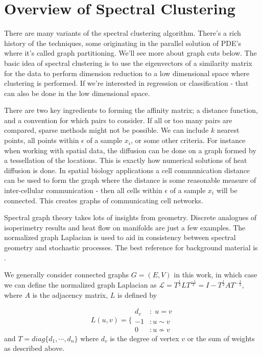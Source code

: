 \section*{Overview of Spectral Clustering}

There are many variants of the spectral clustering algorithm. There's a rich history of the techniques, some originating in the parallel solution of PDE's where it's called graph partitioning.  We'll see more about graph cuts below. The basic idea of spectral clustering is to use the eigenvectors of a similarity matrix for the data to perform dimension reduction to a low dimensional space where clustering is performed.  If we're interested in regression or classification - that can also be done in the low dimensional space. 

There are two key ingredients to forming the affinity matrix; a distance function, and a convention for which pairs to consider.  If all or too many pairs are compared, sparse methods might not be possible.  We can include $k$ nearest points, all points within $\epsilon$ of a sample $x_i$, or some other criteria. For instance when working with spatial data, the diffusion can be done on a graph formed by a tessellation of the locations.  This is exactly how numerical solutions of heat diffusion is done. In spatial biology applications a cell communication distance can be used to form the graph where the distance is some reasonable measure of inter-cellular communication - then all cells within $\epsilon$ of a sample $x_i$ will be connected. This creates graphs of communicating cell networks. 

Spectral graph theory takes lots of insights from geometry.  Discrete analogues of isoperimetry results and heat flow on manifolds are just a few examples.  The normalized graph Laplacian is used to aid in consistency between spectral geometry and stochastic processes.  The best reference for background material is \cite{chung1997spectral}. 

We generally consider connected graphs $G = (E,V)$ in this work, in which case we can define the normalized graph Laplacian as $\mathcal{L} = T^{\frac{1}{2}} L T^{\frac{-1}{2}} = I - T^{\frac{1}{2}} A T^{-\frac{1}{2}}$, where $A$ is the adjacency matrix, $L$ is defined by

\begin{equation*}
L(u,v)  = \Biggl\{
\begin{array}{cc}
 d_v & :\; u=v \\
 -1  & : u\sim v  \\
 0   & : u \nsim v  \end{array}
\end{equation*} and
$T = diag\{d_1, \cdots , d_n\}$ where $d_v$ is the degree of vertex $v$ or the sum of weights as described above.

